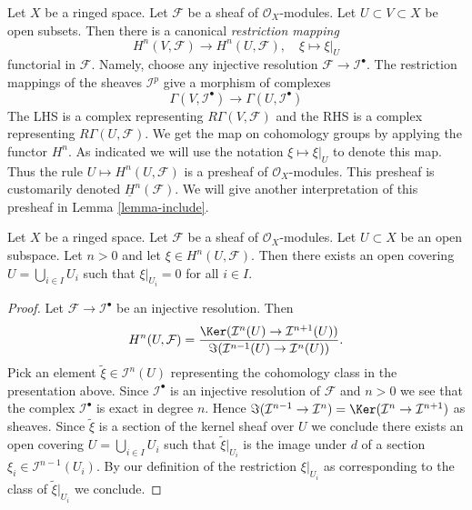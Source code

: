 \noindent
Let $X$ be a ringed space.
Let $\mathcal{F}$ be a sheaf of $\mathcal{O}_X$-modules.
Let $U \subset V \subset X$ be open subsets.
Then there is a canonical {\it restriction mapping}
\begin{equation}
\label{equation-restriction-mapping}
H^n(V, \mathcal{F})
\longrightarrow
H^n(U, \mathcal{F}), \quad
\xi \longmapsto \xi|_U
\end{equation}
functorial in $\mathcal{F}$. Namely, choose any injective
resolution $\mathcal{F} \to \mathcal{I}^\bullet$. The restriction
mappings of the sheaves $\mathcal{I}^p$ give a morphism of complexes
$$
\Gamma(V, \mathcal{I}^\bullet)
\longrightarrow
\Gamma(U, \mathcal{I}^\bullet)
$$
The LHS is a complex representing $R\Gamma(V, \mathcal{F})$
and the RHS is a complex representing $R\Gamma(U, \mathcal{F})$.
We get the map on cohomology groups by applying the functor $H^n$.
As indicated we will use the notation $\xi \mapsto \xi|_U$ to denote this map.
Thus the rule $U \mapsto H^n(U, \mathcal{F})$ is a presheaf of
$\mathcal{O}_X$-modules. This presheaf is customarily denoted
$\underline{H}^n(\mathcal{F})$. We will give another interpretation
of this presheaf in Lemma \ref{lemma-include}.

\begin{lemma}
\label{lemma-kill-cohomology-class-on-covering}
Let $X$ be a ringed space.
Let $\mathcal{F}$ be a sheaf of $\mathcal{O}_X$-modules.
Let $U \subset X$ be an open subspace.
Let $n > 0$ and let $\xi \in H^n(U, \mathcal{F})$.
Then there exists an open covering
$U = \bigcup_{i\in I} U_i$ such that $\xi|_{U_i} = 0$ for
all $i \in I$.
\end{lemma}

\begin{proof}
Let $\mathcal{F} \to \mathcal{I}^\bullet$ be an injective resolution.
Then
$$
H^n(U, \mathcal{F}) =
\frac{\Ker(\mathcal{I}^n(U) \to \mathcal{I}^{n + 1}(U))}
{\Im(\mathcal{I}^{n - 1}(U) \to \mathcal{I}^n(U))}.
$$
Pick an element $\tilde \xi \in \mathcal{I}^n(U)$ representing the
cohomology class in the presentation above. Since $\mathcal{I}^\bullet$
is an injective resolution of $\mathcal{F}$ and $n > 0$ we see that
the complex $\mathcal{I}^\bullet$ is exact in degree $n$. Hence
$\Im(\mathcal{I}^{n - 1} \to \mathcal{I}^n) =
\Ker(\mathcal{I}^n \to \mathcal{I}^{n + 1})$ as sheaves.
Since $\tilde \xi$ is a section of the kernel sheaf over $U$
we conclude there exists an open covering $U = \bigcup_{i \in I} U_i$
such that $\tilde \xi|_{U_i}$ is the image under $d$ of a section
$\xi_i \in \mathcal{I}^{n - 1}(U_i)$. By our definition of the
restriction $\xi|_{U_i}$ as corresponding to the class of
$\tilde \xi|_{U_i}$ we conclude.
\end{proof}

